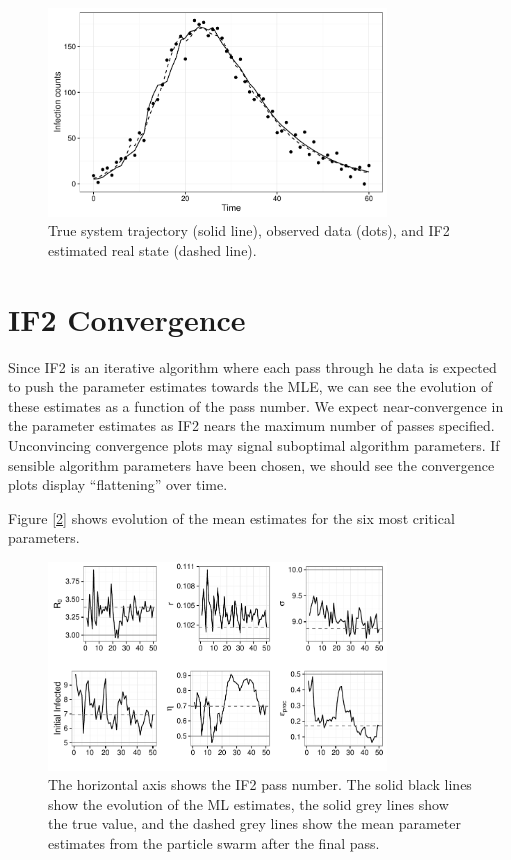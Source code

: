 	\begin{figure}
        \centering
        \captionsetup{width=.8\linewidth}
        \includegraphics[width=0.8\textwidth]{./images/if2state.pdf}
        \caption{True system trajectory (solid line), observed data (dots), and IF2 estimated real state (dashed line). \label{if2state}}
    \end{figure}


\section{IF2 Convergence}

	Since IF2 is an iterative algorithm where each pass through he data is expected to push the parameter estimates towards the MLE, we can see the evolution of these estimates as a function of the pass number. We expect near-convergence in the parameter estimates as IF2 nears the maximum number of passes specified. Unconvincing convergence plots may signal suboptimal algorithm parameters. If sensible algorithm parameters have been chosen, we should see the convergence plots display ``flattening'' over time.

	Figure [\ref{if2convergence}] shows evolution of the mean estimates for the six most critical parameters.

	\begin{figure}
        \centering
        \captionsetup{width=.8\linewidth}
        \includegraphics[width=0.8\textwidth]{./images/if2convergence.pdf}
        \caption{The horizontal axis shows the IF2 pass number. The solid black lines show the evolution of the ML estimates, the solid grey lines show the true value, and the dashed grey lines show the mean parameter estimates from the particle swarm after the final pass. \label{if2convergence}}
    \end{figure}

